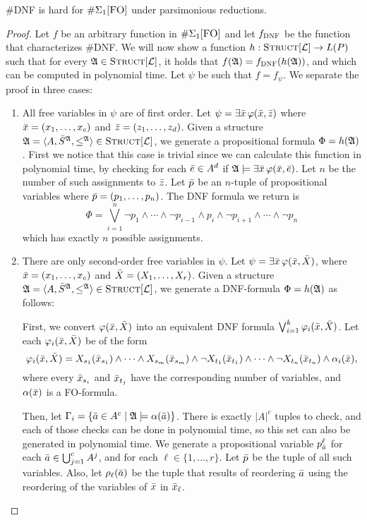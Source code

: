 \begin{theo}
	{\sc \#DNF} is hard for $\E1$ under parsimonious reductions. 
\end{theo}
\begin{proof}
	Let $f$ be an arbitrary function in $\E1$ and let $f_{\textsc{DNF}}$ be the function that characterizes {\sc \#DNF}. We will now show a function $h:\textsc{Struct}[{\cal L}]\to L(P)$ such that for every ${\frak A}\in\textsc{Struct}[{\cal L}]$, it holds that $f({\frak A}) = f_{\textsc{DNF}}(h({\frak A}))$, and which can be computed in polynomial time. Let $\psi$ be such that $f = f_{\psi}$. We separate the proof in three cases:
	\begin{enumerate}
		\item All free variables in $\psi$ are of first order. Let $\psi = \exists \bar{x}\,\varphi(\bar{x},\bar{z})$ where $\bar{x} = (x_1,\ldots,x_c)$ and $\bar{z} = (z_1,\ldots,z_d)$. Given a structure ${\frak A} = \langle A, \bar{S}^{{\frak A}}, \leq^{{\frak A}} \rangle\in\textsc{Struct}[{\cal L}]$, we generate a propositional formula $\Phi = h({\frak A})$. First we notice that this case is trivial since we can calculate this function in polynomial time, by checking for each $\bar{e}\in A^d$ if ${\frak A}\models\exists\bar{x}\,\varphi(\bar{x},\bar{e})$. Let $n$ be the number of such assignments to $\bar{z}$. Let $\bar{p}$ be an $n$-tuple of propositional variables where $\bar{p} = (p_1,\ldots,p_n)$. The DNF formula we return is
		\[
		\Phi = \bigvee_{i = 1}^n \neg p_1 \wedge \cdots \wedge \neg p_{i-1} \wedge p_i \wedge \neg p_{i+1} \wedge \cdots \wedge \neg p_n
		\]
		which has exactly $n$ possible assignments.
		
		\item There are only second-order free variables in $\psi$. Let $\psi = \exists \bar{x}\,\varphi(\bar{x},\bar{X})$, where $\bar{x} = (x_1,\ldots,x_c)$ and $\bar{X} = (X_1,\ldots,X_r)$. Given a structure ${\frak A} = \langle A, \bar{S}^{{\frak A}}, \leq^{{\frak A}} \rangle\in\textsc{Struct}[{\cal L}]$, we generate a DNF-formula $\Phi = h({\frak A})$ as follows:
		
		First, we convert $\varphi(\bar{x},\bar{X})$ into an equivalent DNF formula $\bigvee_{i = 1}^k \varphi_{i}(\bar{x},\bar{X})$. Let each $\varphi_{i}(\bar{x},\bar{X})$ be of the form
		\[
		\varphi_{i}(\bar{x},\bar{X}) = X_{s_1}(\bar{x}_{s_1}) \wedge \cdots \wedge X_{s_m}(\bar{x}_{s_m}) \wedge \neg X_{t_1}(\bar{x}_{t_1}) \wedge \cdots \wedge \neg X_{t_n}(\bar{x}_{t_n}) \wedge \alpha_i(\bar{x}),
		\]
		where every $\bar{x}_{s_i}$ and $\bar{x}_{t_j}$ have the corresponding number of variables, and $\alpha(\bar{x})$ is a FO-formula.
		
		Then, let $\Gamma_i = \{\bar{a}\in A^c\mid {\frak A}\models\alpha(\bar{a})\}$. There is exactly $\vert A \vert^c$ tuples to check, and each of those checks can be done in polynomial time, so this set can also be generated in polynomial time. We generate a propositional variable $p^{\ell}_{\bar{a}}$ for each $\bar{a}\in \bigcup_{j = 1}^c A^j$, and for each $\ell\in\{1,\ldots,r\}$. Let $\bar{p}$ be the tuple of all such variables. Also, let $\rho_{\ell}(\bar{a})$ be the tuple that results of reordering $\bar{a}$ using the reordering of the variables of $\bar{x}$ in $\bar{x}_{\ell}$.
		

\end{enumerate}
\end{proof}
